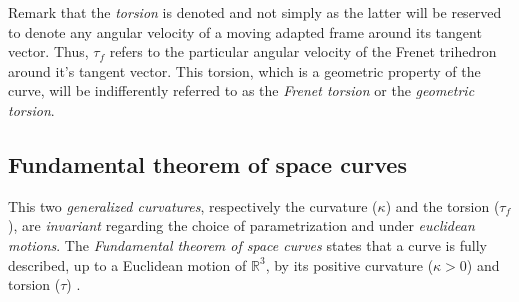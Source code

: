 Remark that the \emph{torsion} is denoted  and not simply \textquote{$\tau$} as the latter will be reserved to denote any angular velocity of a moving adapted frame around its tangent vector. Thus, $\tau_f$ refers to the particular angular velocity of the Frenet trihedron around it's tangent vector. This torsion, which is a geometric property of the curve, will be indifferently referred to as the \emph{Frenet torsion} or the \emph{geometric torsion}.

\subsection{Fundamental theorem of space curves}\label{sec:fundamental}
This two \emph{generalized curvatures}, respectively the curvature ($\kappa$) and the torsion ($\tau_f$), are \emph{invariant} regarding the choice of parametrization and under \emph{euclidean motions}. The \emph{Fundamental theorem of space curves} states that a curve is fully described, up to a Euclidean motion of ${\mathbb{R}}^3$, by its positive curvature ($\kappa > 0$) and torsion ($\tau$) \cite[p.229]{Gray2006}.

